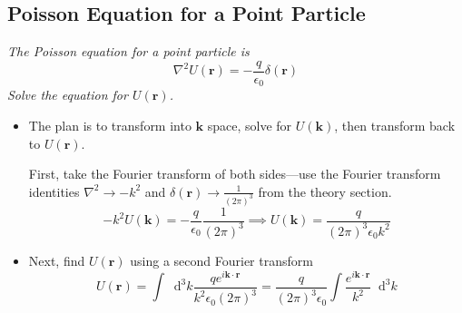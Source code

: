 \documentclass[11pt, a4paper]{article}
\newcommand{\diff}{\mathop{}\!\mathrm{d}} %
\renewcommand{\vec}[1]{\bm{#1}} %
\renewcommand{\r}{\vec{r}}
\newcommand{\ee}{\epsilon_{0}}  %
\begin{document}
\subsection{Poisson Equation for a Point Particle}
\textit{The Poisson equation for a point particle is}
\begin{equation*}
	\nabla^{2}U(\r) = - \frac{q}{\ee} \delta (\r)
\end{equation*}
\textit{Solve the equation for $ U(\r) $.}
\begin{itemize}
	
	\item The plan is to transform into $ \vec{k} $ space, solve for $ U(\vec{k}) $, then transform back to $ U(\r) $. 
	
	First, take the Fourier transform of both sides---use the Fourier transform identities $ \nabla^{2} \to -k^{2} $ and $ \delta(\r) \to \frac{1}{(2\pi)^{3}} $ from the theory section.
	\begin{equation*}
		- k^{2}U(\vec{k}) = - \frac{q}{\ee} \frac{1}{(2\pi)^{3}} \implies U(\vec{k}) = \frac{q}{(2\pi)^{3} \ee k^{2}}
	\end{equation*}
	
	\item Next, find $ U(\r) $ using a second Fourier transform
	\begin{equation*}
		U(\r) = \int \diff^{3} k \frac{q e^{i\vec{k}\cdot \r}}{k^{2}\ee(2\pi)^{3}} = \frac{q}{(2\pi)^{3}\ee} \int \frac{e^{i\vec{k}\cdot \r}}{k^{2}} \diff^{3}k
	\end{equation*}
	

\end{itemize}
\end{document}
